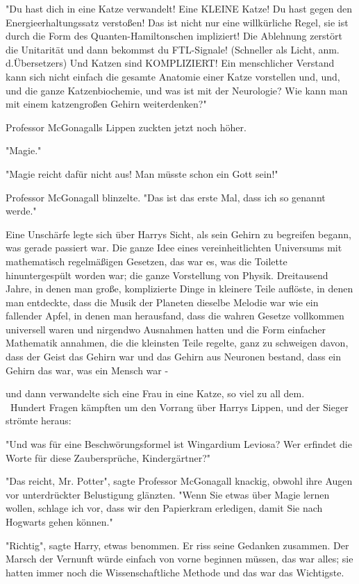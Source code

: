 {"Du hast dich in eine Katze verwandelt! Eine KLEINE Katze! Du hast gegen den Energieerhaltungssatz verstoßen! Das ist nicht nur eine willkürliche Regel, sie ist durch die Form des Quanten-Hamiltonschen impliziert! Die Ablehnung zerstört die Unitarität und dann bekommst du FTL-Signale! (Schneller als Licht, anm. d.Übersetzers) Und Katzen sind KOMPLIZIERT! Ein menschlicher Verstand kann sich nicht einfach die gesamte Anatomie einer Katze vorstellen und, und, und die ganze Katzenbiochemie, und was ist mit der Neurologie? Wie kann man mit einem katzengroßen Gehirn weiterdenken?" ~ ~

Professor McGonagalls Lippen zuckten jetzt noch höher.

"Magie." ~ ~

"Magie reicht dafür nicht aus! Man müsste schon ein Gott sein!" ~ ~

Professor McGonagall blinzelte. "Das ist das erste Mal, dass ich so genannt werde."

Eine Unschärfe legte sich über Harrys Sicht, als sein Gehirn zu begreifen begann, was gerade passiert war. Die ganze Idee eines vereinheitlichten Universums mit mathematisch regelmäßigen Gesetzen, das war es, was die Toilette hinuntergespült worden war; die ganze Vorstellung von Physik. Dreitausend Jahre, in denen man große, komplizierte Dinge in kleinere Teile auflöste, in denen man entdeckte, dass die Musik der Planeten dieselbe Melodie war wie ein fallender Apfel, in denen man herausfand, dass die wahren Gesetze vollkommen universell waren und nirgendwo Ausnahmen hatten und die Form einfacher Mathematik annahmen, die die kleinsten Teile regelte, ganz zu schweigen davon, dass der Geist das Gehirn war und das Gehirn aus Neuronen bestand, dass ein Gehirn das war, was ein Mensch war -

und dann verwandelte sich eine Frau in eine Katze, so viel zu all dem. ~ ~Hundert Fragen kämpften um den Vorrang über Harrys Lippen, und der Sieger strömte heraus:

"Und was für eine Beschwörungsformel ist Wingardium Leviosa? Wer erfindet die Worte für diese Zaubersprüche, Kindergärtner?" ~ ~

"Das reicht, Mr. Potter", sagte Professor McGonagall knackig, obwohl ihre Augen vor unterdrückter Belustigung glänzten. "Wenn Sie etwas über Magie lernen wollen, schlage ich vor, dass wir den Papierkram erledigen, damit Sie nach Hogwarts gehen können." ~ ~

"Richtig", sagte Harry, etwas benommen. Er riss seine Gedanken zusammen. Der Marsch der Vernunft würde einfach von vorne beginnen müssen, das war alles; sie hatten immer noch die Wissenschaftliche Methode und das war das Wichtigste.

}
